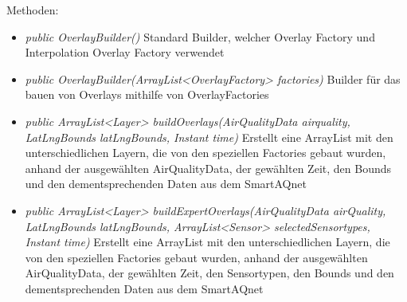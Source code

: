 Methoden:
\begin{itemize}
    \item \emph{public OverlayBuilder()} Standard Builder, welcher Overlay Factory und Interpolation Overlay Factory verwendet
    \item \emph{public OverlayBuilder(ArrayList<OverlayFactory> factories)} Builder für das bauen von Overlays mithilfe von OverlayFactories
    \item \emph{public ArrayList<Layer> buildOverlays(AirQualityData airquality, LatLngBounds latLngBounds, Instant time)} Erstellt eine ArrayList mit den unterschiedlichen Layern, die von den speziellen Factories gebaut wurden, anhand der ausgewählten AirQualityData, der gewählten Zeit, den Bounds und den dementsprechenden Daten aus dem SmartAQnet
    \item \emph{public ArrayList<Layer> buildExpertOverlays(AirQualityData airQuality, LatLngBounds latLngBounds, ArrayList<Sensor> selectedSensortypes, Instant time)} Erstellt eine ArrayList mit den unterschiedlichen Layern, die von den speziellen Factories gebaut wurden, anhand der ausgewählten AirQualityData, der gewählten Zeit, den Sensortypen, den Bounds und den dementsprechenden Daten aus dem SmartAQnet
\end{itemize}
